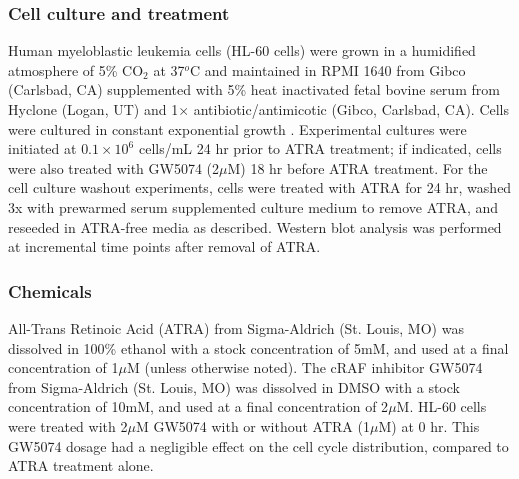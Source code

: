 \documentclass[10pt,twocolumn,twoside,final]{IEEEtran}
\begin{document}
\subsubsection*{Cell culture and treatment}
Human myeloblastic leukemia cells (HL-60 cells) were grown in a humidified atmosphere of 5\% CO$_2$ at 37$^{o}$C and maintained in RPMI 1640 from Gibco (Carlsbad, CA)
supplemented with 5\% heat inactivated fetal bovine serum from Hyclone (Logan, UT) and 1$\times$ antibiotic/antimicotic (Gibco, Carlsbad, CA).
Cells were cultured in constant exponential growth \cite{Brooks1996}.
Experimental cultures were initiated at $0.1\times10^6$ cells/mL 24 hr prior to ATRA treatment;
if indicated, cells were also treated with GW5074 (2$\mu$M) 18 hr before ATRA treatment.
For the cell culture washout experiments, cells were treated with ATRA for 24 hr,
washed 3x with prewarmed serum supplemented culture medium to remove ATRA,
and reseeded in ATRA-free media as described.
Western blot analysis was performed at incremental time points after removal of ATRA.

\subsubsection*{Chemicals}
All-Trans Retinoic Acid (ATRA) from Sigma-Aldrich (St. Louis, MO) was dissolved in
100\% ethanol with a stock concentration of 5mM, and used at a final concentration of 1$\mu$M (unless otherwise noted).
The cRAF inhibitor GW5074 from Sigma-Aldrich (St. Louis, MO) was dissolved in DMSO with a stock concentration of 10mM,
and used at a final concentration of 2$\mu$M.
HL-60 cells were treated with 2$\mu$M GW5074 with or without ATRA (1$\mu$M) at 0 hr.
This GW5074 dosage had a negligible effect on the cell cycle distribution, compared to ATRA treatment alone.
\end{document}
